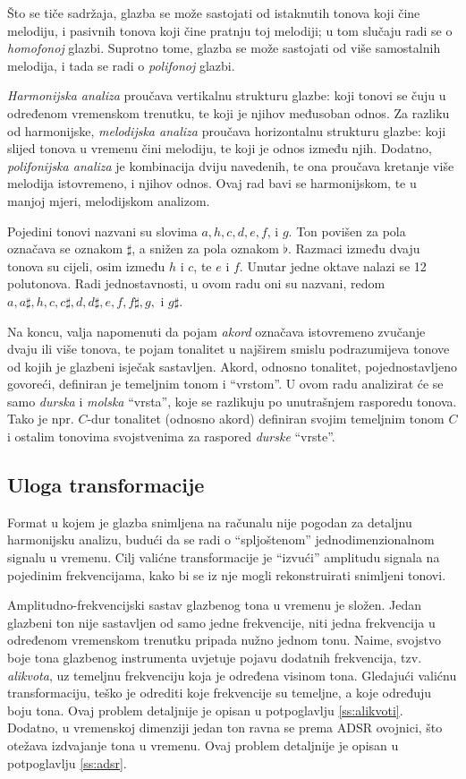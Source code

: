 \documentclass[a4paper, 11pt, twocolumn]{article}
\begin{document}
Što se tiče sadržaja, glazba se može sastojati od istaknutih tonova koji čine melodiju, i pasivnih tonova koji čine pratnju toj melodiji; u tom slučaju radi se o \textit{homofonoj} glazbi.
Suprotno tome, glazba se može sastojati od više samostalnih melodija, i tada se radi o \textit{polifonoj} glazbi.

\textit{Harmonijska analiza} proučava vertikalnu strukturu glazbe: koji tonovi se čuju u određenom vremenskom trenutku, te koji je njihov međusoban odnos.
Za razliku od harmonijske, \textit{melodijska analiza} proučava horizontalnu strukturu glazbe: koji slijed tonova u vremenu čini melodiju, te koji je odnos između njih.
Dodatno, \textit{polifonijska analiza} je kombinacija dviju navedenih, te ona proučava kretanje više melodija istovremeno, i njihov odnos.
Ovaj rad bavi se harmonijskom, te u manjoj mjeri, melodijskom analizom.

Pojedini tonovi nazvani su slovima $a, h, c, d, e, f$, i $g$.
Ton povišen za pola označava se oznakom $\sharp$, a snižen za pola  oznakom $\flat$.
Razmaci između dvaju tonova su cijeli, osim između $h$ i $c$, te $e$ i $f$.
Unutar jedne oktave nalazi se 12 polutonova.
Radi jednostavnosti, u ovom radu oni su nazvani, redom $a, a\sharp, h, c, c\sharp, d, d\sharp, e, f, f\sharp, g,$ i $g\sharp$.

Na koncu, valja napomenuti da pojam \textit{akord} označava istovremeno zvučanje dvaju ili više tonova, te pojam tonalitet u najširem smislu podrazumijeva tonove od kojih je glazbeni isječak sastavljen.
Akord, odnosno tonalitet, pojednostavljeno govoreći, definiran je temeljnim tonom i ``vrstom''.
U ovom radu analizirat će se samo \textit{durska} i \textit{molska} ``vrsta'', koje se razlikuju po unutrašnjem rasporedu tonova.
Tako je npr. $C$-dur tonalitet (odnosno akord) definiran svojim temeljnim tonom $C$ i ostalim tonovima svojstvenima za raspored \textit{durske} ``vrste''\cite{osnove}.

\subsection{Uloga transformacije}
Format u kojem je glazba snimljena na računalu nije pogodan za detaljnu harmonijsku analizu, budući da se radi o ``spljoštenom'' jednodimenzionalnom signalu u vremenu.
Cilj valićne transformacije je ``izvući'' amplitudu signala na pojedinim frekvencijama, kako bi se iz nje mogli rekonstruirati snimljeni tonovi.

Amplitudno-frekvencijski sastav glazbenog tona u vremenu je složen.
Jedan glazbeni ton nije sastavljen od samo jedne frekvencije, niti jedna frekvencija u određenom vremenskom trenutku pripada nužno jednom tonu.
Naime, svojstvo boje tona glazbenog instrumenta uvjetuje pojavu dodatnih frekvencija, tzv. \textit{alikvota}, uz temeljnu frekvenciju koja je određena visinom tona.
Gledajući valićnu transformaciju, teško je odrediti koje frekvencije su temeljne, a koje određuju boju tona.
Ovaj problem detaljnije je opisan u potpoglavlju \ref{ss:alikvoti}.
Dodatno, u vremenskoj dimenziji jedan ton ravna se prema ADSR ovojnici, što otežava izdvajanje tona u vremenu.
Ovaj problem detaljnije je opisan u potpoglavlju \ref{ss:adsr}.
\end{document}
